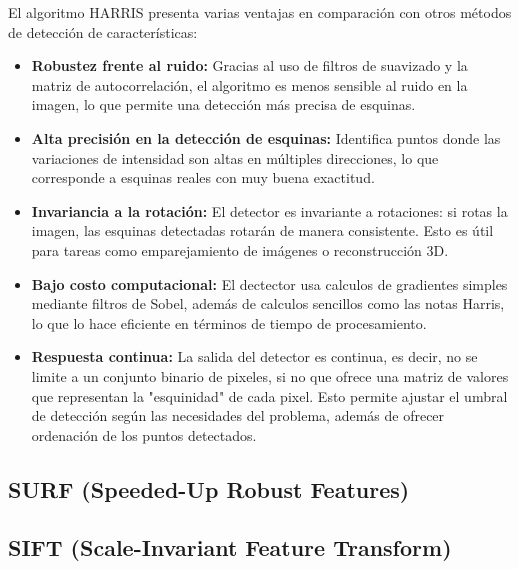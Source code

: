 \documentclass[a4paper]{article}
\begin{document}
  El algoritmo HARRIS presenta varias ventajas en comparación con otros métodos de detección de características:
  
  \begin{itemize}
      \item \textbf{Robustez frente al ruido:}  
      Gracias al uso de filtros de suavizado y la matriz de autocorrelación, el algoritmo es menos sensible al ruido en la imagen, lo que permite una detección más precisa de esquinas.
      
      \item \textbf{Alta precisión en la detección de esquinas:}  
      Identifica puntos donde las variaciones de intensidad son altas en múltiples direcciones, lo que corresponde a esquinas reales con muy buena exactitud.
      
      \item \textbf{Invariancia a la rotación:}  
      El detector es invariante a rotaciones: si rotas la imagen, las esquinas detectadas rotarán de manera consistente. Esto es útil para tareas como emparejamiento de imágenes o reconstrucción 3D.
      
      \item \textbf{Bajo costo computacional:}  
      El dectector usa calculos de gradientes simples mediante filtros de Sobel, además de calculos sencillos como las notas Harris, lo que lo hace eficiente en términos de tiempo de procesamiento.
      
      \item \textbf{Respuesta continua:}
      La salida del detector es continua, es decir, no se limite a un conjunto binario de pixeles, si no que ofrece una matriz
      de valores que representan la "esquinidad" de cada pixel. Esto permite ajustar el umbral de detección según las necesidades del problema, además de ofrecer ordenación de los puntos detectados.  
    \end{itemize}
  
  \par\vspace{0.5cm}


  \subsection{SURF (Speeded-Up Robust Features)}
  \par\vspace{0.5cm}

  \subsection{SIFT (Scale-Invariant Feature Transform)}
  \par\vspace{0.5cm}
  
\end{document}
